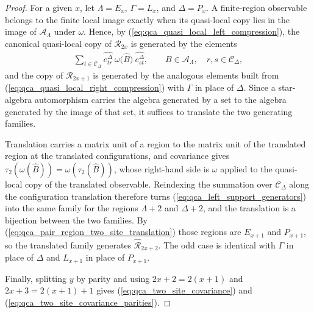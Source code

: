 \begin{proof}\leanok
    For a given $x$, let $\Lambda=E_x$, $\Gamma=L_x$, and $\Delta=P_x$.  A
    finite-region observable belongs to the finite local image exactly when
    its quasi-local copy lies in the image of $\mathcal A_\Lambda$ under
    $\omega$.  Hence, by
    (\ref{eq:qca_quasi_local_left_compression}), the canonical quasi-local
    copy of $\mathcal R_{2x}$ is generated by the elements
    \begin{align}
        \sum_{t\in\mathcal C_\Delta}
        \widehat{e^\Delta_{tr}}\ \omega\bigl(\widehat B\bigr)\
        \widehat{e^\Delta_{st}},
        \qquad B\in\mathcal A_\Lambda,\quad r,s\in\mathcal C_\Delta,
        \label{eq:qca_left_support_generators}
    \end{align}
    and the copy of $\mathcal R_{2x+1}$ is generated by the analogous
    elements built from (\ref{eq:qca_quasi_local_right_compression}) with
    $\Gamma$ in place of $\Delta$.  Since a star-algebra automorphism carries
    the algebra generated by a set to the algebra generated by the image of
    that set, it suffices to translate the two generating families.

    Translation carries a matrix unit of a region to the matrix unit of the
    translated region at the translated configurations, and covariance gives
    $\tau_2(\omega(\widehat B))=\omega(\tau_2(\widehat B))$, whose right-hand
    side is $\omega$ applied to the quasi-local copy of the translated
    observable.  Reindexing the summation over $\mathcal C_\Delta$ along the
    configuration translation therefore turns
    (\ref{eq:qca_left_support_generators}) into the same family for the
    regions $\Lambda+2$ and $\Delta+2$, and the translation is a bijection
    between the two families.  By
    (\ref{eq:qca_pair_region_two_site_translation}) those regions are
    $E_{x+1}$ and $P_{x+1}$, so the translated family generates
    $\widehat{\mathcal R}_{2x+2}$.  The odd case is identical with $\Gamma$
    in place of $\Delta$ and $L_{x+1}$ in place of $P_{x+1}$.

    Finally, splitting $y$ by parity and using $2x+2=2(x+1)$ and
    $2x+3=2(x+1)+1$ gives (\ref{eq:qca_two_site_covariance}) and
    (\ref{eq:qca_two_site_covariance_parities}).
\end{proof}

